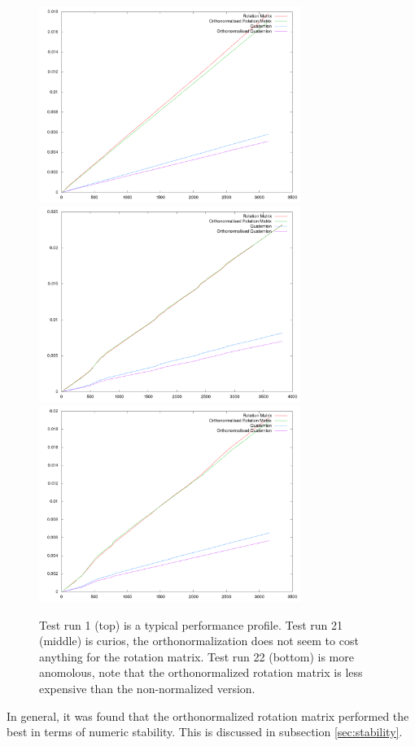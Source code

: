 \documentclass{acm_proc_article-sp}
\begin{document}
\begin{figure}[htpb]
\includegraphics[width=8.5cm]{plots/timing_plot_1.png}
\includegraphics[width=8.5cm]{plots/timing_plot_21.png}
\includegraphics[width=8.5cm]{plots/timing_plot_22.png}
\caption{Test run 1 (top) is a typical performance profile.
Test run 21 (middle) is curios, the orthonormalization does not seem to cost anything for the rotation matrix.
Test run 22 (bottom) is more anomolous, note that the orthonormalized rotation matrix is less expensive than the non-normalized version.}
\label{fig:performance}
\end{figure}

In general, it was found that the orthonormalized rotation matrix performed the best in terms of numeric stability.
This is discussed in subsection \ref{sec:stability}.
\end{document}
